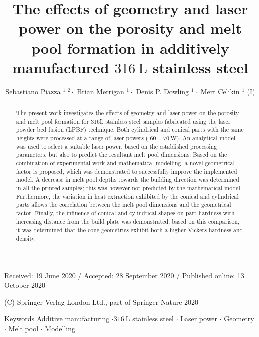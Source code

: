 \documentclass[10pt]{article}
\title{The effects of geometry and laser power on the porosity and melt pool formation in additively manufactured $316 \mathrm{~L}$ stainless steel }
\author{Sebastiano Piazza ${ }^{1,2} \cdot$ Brian Merrigan $^{1} \cdot$ Denis P. Dowling $^{1} \cdot$ Mert Celikin $^{1}$ (I)}
\date{}
\begin{document}
\maketitle
Received: 19 June 2020 / Accepted: 28 September 2020 / Published online: 13 October 2020

(C) Springer-Verlag London Ltd., part of Springer Nature 2020

\begin{abstract}
The present work investigates the effects of geometry and laser power on the porosity and melt pool formation for 316L stainless steel samples fabricated using the laser powder bed fusion (LPBF) technique. Both cylindrical and conical parts with the same heights were processed at a range of laser powers ( $60-70 \mathrm{~W})$. An analytical model was used to select a suitable laser power, based on the established processing parameters, but also to predict the resultant melt pool dimensions. Based on the combination of experimental work and mathematical modelling, a novel geometrical factor is proposed, which was demonstrated to successfully improve the implemented model. A decrease in melt pool depths towards the building direction was determined in all the printed samples; this was however not predicted by the mathematical model. Furthermore, the variation in heat extraction exhibited by the conical and cylindrical parts allows the correlation between the melt pool dimensions and the geometrical factor. Finally, the influence of conical and cylindrical shapes on part hardness with increasing distance from the build plate was demonstrated; based on this comparison, it was determined that the cone geometries exhibit both a higher Vickers hardness and density.
\end{abstract}

Keywords Additive manufacturing $\cdot 316 \mathrm{~L}$ stainless steel $\cdot$ Laser power $\cdot$ Geometry $\cdot$ Melt pool $\cdot$ Modelling
\end{document}
